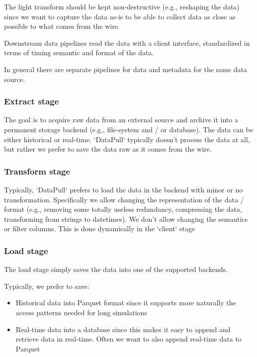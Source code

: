 \documentclass[11pt, reqno]{amsart}
\theoremstyle{definition}
\theoremstyle{remark}
\begin{document}
The light transform should be kept non-destructive (e.g., reshaping the data)
since we want to capture the data as-is to be able to collect data as close as
possible to what comes from the wire.

Downstream data pipelines read the
data with a client interface, standardized in terms of timing semantic
and format of the data.

In general there are separate pipelines for data and metadata for the
same data source.

\subsubsection{Extract stage}

The goal is to acquire raw data from an external source and archive it into a
permanent storage backend (e.g., file-system and / or database). The data can
be either historical or real-time. `DataPull` typically doesn't process the
data at all, but rather we prefer to save the data raw as it comes from the
wire.

\subsubsection{Transform stage}

Typically, `DataPull` prefers to load the data in the
backend with minor or no transformation. Specifically we allow changing the
representation of
the data / format (e.g., removing some totally useless redundancy, compressing
the data, transforming from strings to datetimes). We don't allow changing the
semantics or filter columns. This is done dynamically in the `client` stage

\subsubsection{Load stage}

The load stage simply saves the data into one of the supported backends.

Typically, we prefer to save:
\begin{itemize}
  \item Historical data into Parquet format since it supports more naturally the
        access patterns needed for long simulations
  \item Real-time data into a database since this makes it easy to append and retrieve
        data in real-time. Often we want to also append real-time data to Parquet
\end{itemize}
\end{document}
